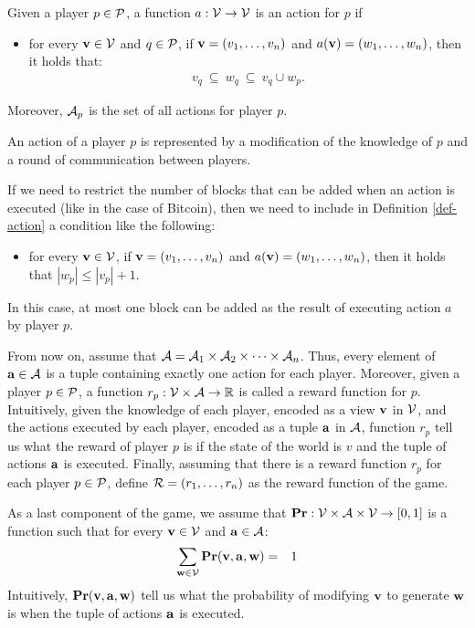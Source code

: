 
\begin{mydef}\label{def-action}
Given a player $p \in \mathcal{P}$, a function $a : \mathcal{V} \to \mathcal{V}$ is an action for $p$ if
\begin{itemize}
\item for every $\mathbf{v} \in \mathcal{V}$ and $q \in \mathcal{P}$, if $\mathbf{v} = (v_1, \ldots, v_n)$ and $a(\mathbf{v}) = (w_1, \ldots, w_n)$, then it holds that:
\begin{eqnarray*}
v_q \ \subseteq \ w_q \ \subseteq \ v_q \cup w_p.
\end{eqnarray*}

\end{itemize}
Moreover, $\mathcal{A}_p$ is the set of all actions for player $p$.
\end{mydef}
An action of a player $p$ is represented by a modification of the knowledge of $p$ and a round of communication between players. 

If we need to restrict the number of blocks that can be added when an action is executed (like in the case of Bitcoin), then we need to include in Definition \ref{def-action} a condition like the following:
\begin{itemize}
\item for every $\mathbf{v} \in \mathcal{V}$, if $\mathbf{v} = (v_1, \ldots, v_n)$ and $a(\mathbf{v}) = (w_1, \ldots, w_n)$, then it holds that $|w_p| \leq |v_p| + 1$.
\end{itemize}
In this case, at most one block can be added as the result of executing action $a$ by player $p$. 

From now on, assume that $\mathcal{A} = \mathcal{A}_{1} \times \mathcal{A}_{2} \times \cdots \times \mathcal{A}_{n}$. Thus, every element of $\mathbf{a} \in \mathcal{A}$ is a tuple containing exactly one action for each player. Moreover, given a player $p \in \mathcal{P}$, a function $r_p : \mathcal{V} \times \mathcal{A} \to \mathbb{R}$ is called a reward function for $p$. Intuitively, given the knowledge of each player, encoded as a view $\mathbf{v}$ in $\mathcal{V}$, and the actions executed by each player, encoded as a tuple $\mathbf{a}$ in $\mathcal{A}$, function $r_p$ tell us what the reward of player $p$ is if the state of the world is $v$ and the tuple of actions $\mathbf{a}$ is executed. Finally, assuming that there is a reward function $r_p$ for each player $p \in \mathcal{P}$, define $\mathcal{R} = (r_1, \ldots, r_n)$ as the reward function of the game.

As a last component of the game, we assume that $\mathbf{Pr} : \mathcal{V} \times \mathcal{A} \times \mathcal{V} \to [0,1]$ is a function such that 
for every $\mathbf{v} \in \mathcal{V}$ and $\mathbf{a} \in \mathcal{A}$:
\begin{eqnarray*}
\sum_{\mathbf{w} \in \mathcal{V}} \mathbf{Pr}(\mathbf{v}, \mathbf{a}, \mathbf{w}) & = & 1
\end{eqnarray*}
Intuitively, $\mathbf{Pr}(\mathbf{v}, \mathbf{a}, \mathbf{w})$ tell us what the probability of modifying $\mathbf{v}$ to generate $\mathbf{w}$ is when the tuple of actions $\mathbf{a}$ is executed.

